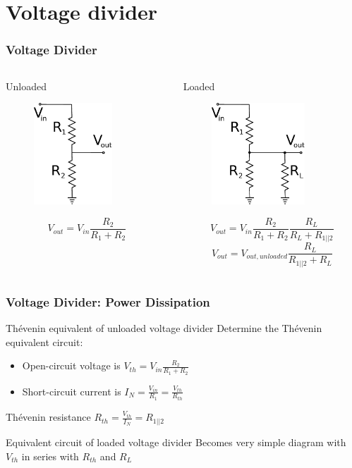 \documentclass[beamer]{standalone}
\begin{document}
\section{Voltage divider}
\begin{frame}
\frametitle{Voltage Divider}
\begin{columns}[t]
 \begin{column}{.45\textwidth}
  \begin{block}{Unloaded}
   \begin{figure}
    \includegraphics[height=1.5in]{./pics/unloaded_voltage_divider}
   \end{figure}
   \[ V_{out} = V_{in} \frac{R_2}{R_1+R_2} \]
  \end{block}
 \end{column}
  \begin{column}{.45\textwidth}
  \begin{block}{Loaded}
   \begin{figure}
    \includegraphics[height=1.5in]{./pics/loaded_voltage_divider}
   \end{figure}
   \[ V_{out} = V_{in} \frac{R_2}{R_1+R_2} \frac{R_L}{R_L + R_{1||2}} \]
   \[ V_{out} = V_{out,unloaded} \frac{R_L}{R_{1||2} + R_L} \]
  \end{block}
 \end{column}
\end{columns}
\end{frame}

\begin{frame}
 \frametitle{Voltage Divider: Power Dissipation}
 \begin{block}{Th\'evenin equivalent of unloaded voltage divider}
  Determine the Th\'evenin equivalent circuit:
  \begin{itemize}
   \item Open-circuit voltage is $V_{th} = V_{in} \frac{R_2}{R_1+R_2}$
   \item Short-circuit current is $I_{N} = \frac{V_{in}}{R_1} = \frac{V_{th}}{R_{th}}$
  \end{itemize}
  Th\'evenin resistance $R_{th} = \frac{V_{th}}{I_{N}} = R_{1||2}$
 \end{block}
 \begin{block}{Equivalent circuit of loaded voltage divider}
  Becomes very simple diagram with $V_{th}$ in series with $R_{th}$ and $R_{L}$
 \end{block}
\end{frame}
\end{document}
